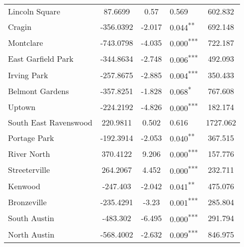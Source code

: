 \documentclass[12pt]{report}
\begin{document}
\begin{longtable}{l S[table-format=6.4] S[table-format=3.4] l S[table-format=4.4]}
	Lincoln Square               & 87.6699              & 0.57             & 0.569                      & 602.832                           \\
	Cragin                       & -356.0392            & -2.017           & 0.044\textsuperscript{**}  & 692.148                           \\
	Montclare                    & -743.0798            & -4.035           & 0.000\textsuperscript{***} & 722.187                           \\
	East Garfield Park           & -344.8634            & -2.748           & 0.006\textsuperscript{***} & 492.093                           \\
	Irving Park                  & -257.8675            & -2.885           & 0.004\textsuperscript{***} & 350.433                           \\
	Belmont Gardens              & -357.8251            & -1.828           & 0.068\textsuperscript{*}   & 767.608                           \\
	Uptown                       & -224.2192            & -4.826           & 0.000\textsuperscript{***} & 182.174                           \\
	South East Ravenswood        & 220.9811             & 0.502            & 0.616                      & 1727.062                          \\
	Portage Park                 & -192.3914            & -2.053           & 0.040\textsuperscript{**}  & 367.515                           \\
	River North                  & 370.4122             & 9.206            & 0.000\textsuperscript{***} & 157.776                           \\
	Streeterville                & 264.2067             & 4.452            & 0.000\textsuperscript{***} & 232.711                           \\
	Kenwood                      & -247.403             & -2.042           & 0.041\textsuperscript{**}  & 475.076                           \\
	Bronzeville                  & -235.4291            & -3.23            & 0.001\textsuperscript{***} & 285.804                           \\
	South Austin                 & -483.302             & -6.495           & 0.000\textsuperscript{***} & 291.794                           \\
	North Austin                 & -568.4002            & -2.632           & 0.009\textsuperscript{***} & 846.975                           \\

\end{longtable}
\end{document}

